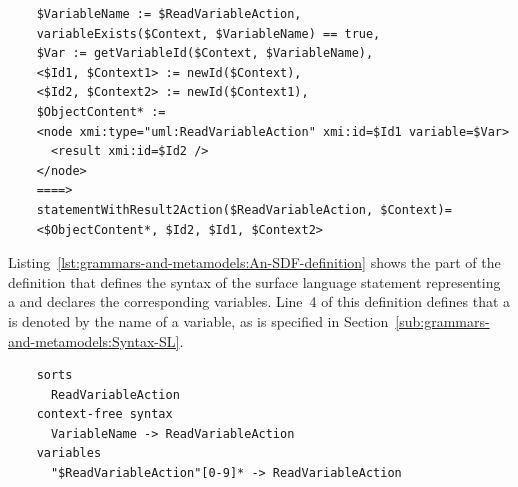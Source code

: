 \begin{listing}
  \lstset{
    language=asf,
    style=asf,
    label=lst:grammars-and-metamodels:ASF-ex,
    caption=\ASF rule that creates a \ReadVariableAction,
    numbers=left
  }
  \begin{lstlisting}
    $VariableName := $ReadVariableAction,
    variableExists($Context, $VariableName) == true,
    $Var := getVariableId($Context, $VariableName),
    <$Id1, $Context1> := newId($Context),
    <$Id2, $Context2> := newId($Context1),
    $ObjectContent* :=
    <node xmi:type="uml:ReadVariableAction" xmi:id=$Id1 variable=$Var>
      <result xmi:id=$Id2 />
    </node>
    ====>
    statementWithResult2Action($ReadVariableAction, $Context)=
    <$ObjectContent*, $Id2, $Id1, $Context2>
  \end{lstlisting}
\end{listing}

Listing~\ref{lst:grammars-and-metamodels:An-SDF-definition} shows the part of the \SDF definition that defines the syntax of the surface language statement representing a \ReadVariableAction and declares the corresponding variables.
Line~4 of this definition defines that a \ReadVariableAction is denoted by the name of a variable, as is specified in Section~\ref{sub:grammars-and-metamodels:Syntax-SL}.

\begin{listing}
  \lstset{
    language=sdf,
    label=lst:grammars-and-metamodels:An-SDF-definition,
    caption=\SDF definition that defines the statement representing a \ReadVariableAction,
    numbers=left
  }
  \begin{lstlisting}
    sorts
      ReadVariableAction
    context-free syntax
      VariableName -> ReadVariableAction
    variables
      "$ReadVariableAction"[0-9]* -> ReadVariableAction
  \end{lstlisting}
\end{listing} 